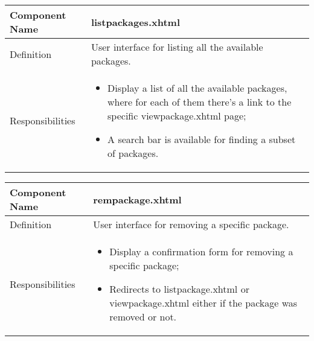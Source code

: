\documentclass[a4paper,12pt]{book}
\begin{document}
    \begin{center}
      \begin{tabular}{ | p{3.3cm} | p{11.7cm} | }
        \hline
        Component Name & \textbf{listpackages.xhtml} \\ \hline
        Definition & User interface for listing all the available packages. \\ \hline
        Responsibilities & \parbox{0.65\textwidth}{
          \begin{itemize}[noitemsep,leftmargin=*]
            \item Display a list of all the available packages, where for each of them there's a link to the specific viewpackage.xhtml page;
            \item A search bar is available for finding a subset of packages.
          \end{itemize}} \\ \hline
        \end{tabular}
      \end{center}
      \begin{center}
        \begin{tabular}{ | p{3.3cm} | p{11.7cm} | }
          \hline
          Component Name & \textbf{rempackage.xhtml} \\ \hline
          Definition & User interface for removing a specific package. \\ \hline
          Responsibilities & \parbox{0.65\textwidth}{
            \begin{itemize}[noitemsep,leftmargin=*]
              \item Display a confirmation form for removing a specific package;
              \item Redirects to listpackage.xhtml or viewpackage.xhtml either if the package was removed or not.
            \end{itemize}} \\ \hline
          \end{tabular}
        \end{center}
\end{document}
